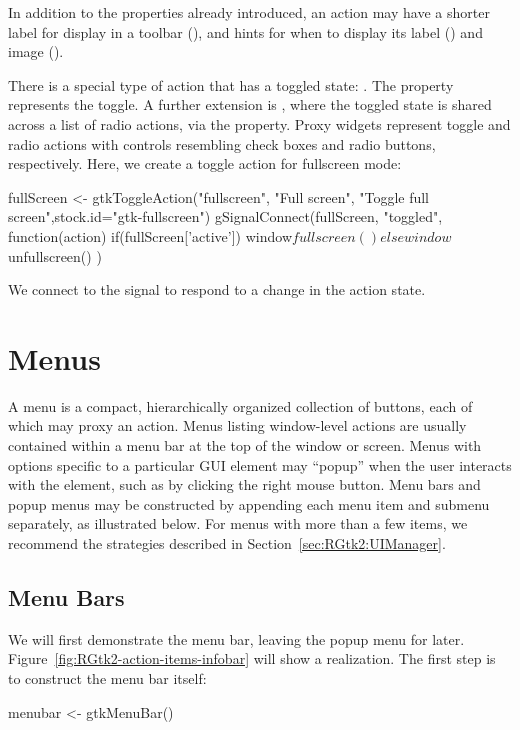 In addition to the properties already introduced, an action may have a
shorter label for display in a toolbar (), and
hints for when to display its label () and image
().

There is a special type of action that has a toggled state:
. The  property represents the
toggle. A further extension is , where the
toggled state is shared across a list of radio actions, via the
 property. Proxy widgets represent toggle and radio
actions with controls resembling check boxes and radio buttons,
respectively. Here, we create a toggle action for fullscreen mode:
\begin{Schunk}
\begin{Sinput}
 fullScreen <- gtkToggleAction("fullscreen", "Full screen", 
                               "Toggle full screen",stock.id="gtk-fullscreen")
 gSignalConnect(fullScreen, "toggled", function(action) {
   if(fullScreen['active'])
     window$fullscreen()
   else
     window$unfullscreen()
 })
\end{Sinput}
\end{Schunk}
%
We connect to the  signal to respond to a change in the
action state.


\section{Menus}
\label{sec:RGtk2:menus}

A menu is a compact, hierarchically organized collection of buttons,
each of which may proxy an action. Menus listing window-level actions
are usually contained within a menu bar at the top of the window or
screen. Menus with options specific to a particular GUI element may
``popup'' when the user interacts with the element, such as by
clicking the right mouse button. Menu bars and popup menus may be
constructed by appending each menu item and submenu separately, as
illustrated below. For menus with more than a few items, we recommend
the strategies described in Section~\ref{sec:RGtk2:UIManager}.

\subsection{Menu Bars}

We will first demonstrate the menu bar, leaving the popup menu for
later. Figure~\ref{fig:RGtk2-action-items-infobar} will show a
realization. The first step is to construct the menu bar itself:
\begin{Schunk}
\begin{Sinput}
 menubar <- gtkMenuBar()
\end{Sinput}
\end{Schunk}


